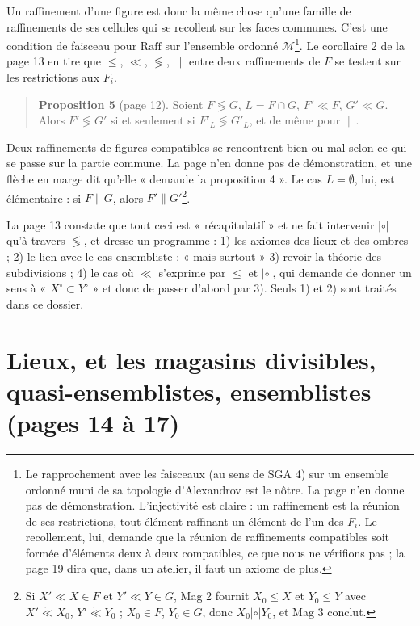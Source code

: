 \documentclass[11pt,a4paper]{article}
\begin{document}
Un raffinement d'une figure est donc la même chose qu'une famille de
raffinements de ses cellules qui se recollent sur les faces communes. C'est une
condition de faisceau pour $\mathrm{Raff}$ sur l'ensemble ordonné
$\mathcal{M}$\footnote{Le rapprochement avec les faisceaux (au sens de SGA 4)
sur un ensemble ordonné muni de sa topologie d'Alexandrov est le nôtre. La page
n'en donne pas de démonstration. L'injectivité est claire : un raffinement est
la réunion de ses restrictions, tout élément raffinant un élément de l'un des
$F_{i}$. Le recollement, lui, demande que la réunion de raffinements compatibles
soit formée d'éléments deux à deux compatibles, ce que nous ne vérifions pas ;
la page 19 dira que, dans un atelier, il faut un axiome de plus.}. Le
corollaire 2 de la page 13 en tire que $\leq$, $\ll$, $\lessgtr$, $\parallel$
entre deux raffinements de $F$ se testent sur les restrictions aux $F_{i}$.

\begin{quote}
\textbf{Proposition 5} (page 12). Soient $F \lessgtr G$, $L = F \cap G$, $F'
\ll F$, $G' \ll G$. Alors $F' \lessgtr G'$ si et seulement si $F'_{L} \lessgtr
G'_{L}$, et de même pour $\parallel$.
\end{quote}

Deux raffinements de figures compatibles se rencontrent bien ou mal selon ce
qui se passe sur la partie commune. La page n'en donne pas de démonstration, et
une flèche en marge dit qu'elle « demande la proposition 4 ». Le cas $L =
\emptyset$, lui, est élémentaire : si $F \parallel G$, alors $F' \parallel
G'$\footnote{Si $X' \ll X \in F$ et $Y' \ll Y \in G$, Mag 2 fournit $X_{0} \leq
X$ et $Y_{0} \leq Y$ avec $X' \mathrel{\mathring{\ll}} X_{0}$, $Y'
\mathrel{\mathring{\ll}} Y_{0}$ ; $X_{0} \in F$, $Y_{0} \in G$, donc $X_{0}
\mathrel{|\circ|} Y_{0}$, et Mag 3 conclut.}.

La page 13 constate que tout ceci est « récapitulatif » et ne fait intervenir
$\mathrel{|\circ|}$ qu'à travers $\lessgtr$, et dresse un programme : 1) les
axiomes des lieux et des ombres ; 2) le lien avec le cas ensembliste ; « mais
surtout » 3) revoir la théorie des subdivisions ; 4) le cas où $\ll$ s'exprime
par $\leq$ et $\mathrel{|\circ|}$, qui demande de donner un sens à « $X^{\circ}
\subset Y^{\circ}$ » et donc de passer d'abord par 3). Seuls 1) et 2) sont
traités dans ce dossier.

\section*{Lieux, et les magasins divisibles, quasi-ensemblistes, ensemblistes (pages 14 à 17)}
\end{document}
